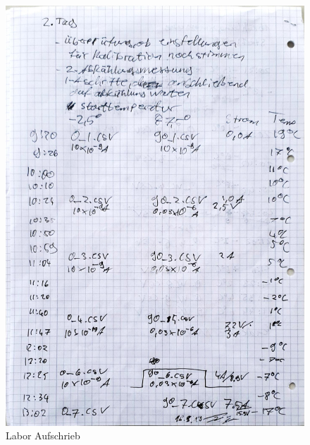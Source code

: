 \begin{figure}
	\includegraphics[scale=0.35]{Bild/Lab4}
	\centering
	\caption{Labor Aufschrieb}
\end{figure}


\FloatBarrier

